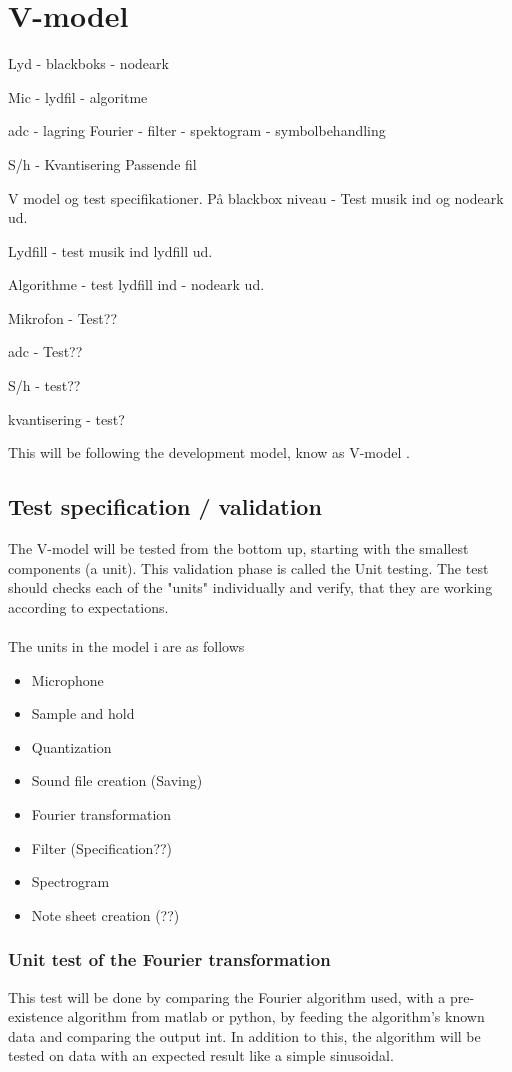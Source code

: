 \section{V-model}

Lyd - blackboks - nodeark

Mic - lydfil - algoritme

adc - lagring  Fourier - filter - spektogram - symbolbehandling

S/h - Kvantisering  Passende fil




V model og test specifikationer.
På blackbox niveau - Test musik ind og nodeark ud.

Lydfill - test musik ind lydfill ud.

Algorithme - test lydfill ind - nodeark ud.



Mikrofon - Test??

adc - Test??

S/h - test??

kvantisering - test? 


This will be following the development model, know as  V-model \cite{v-model}.

\subsection{Test specification / validation}
The V-model will be tested from the bottom up, starting with the smallest components (a unit). This validation phase is called the Unit testing. The test should checks each of the "units" individually and verify, that they are working according to expectations. \\\\

The  units in the model i are as follows 
\begin{itemize}
	\item Microphone
	\item Sample and hold
	\item Quantization
	\item Sound file creation (Saving)
	\item Fourier transformation
	\item Filter (Specification??)
	\item Spectrogram
	\item Note sheet creation (??)
\end{itemize}


\subsubsection{Unit test of the Fourier transformation}
This test will be done by comparing the Fourier algorithm used, with a pre-existence algorithm from matlab or python, by feeding the algorithm's known data and comparing the output int. In addition to this, the algorithm will be tested on data with an expected result like a simple sinusoidal.
